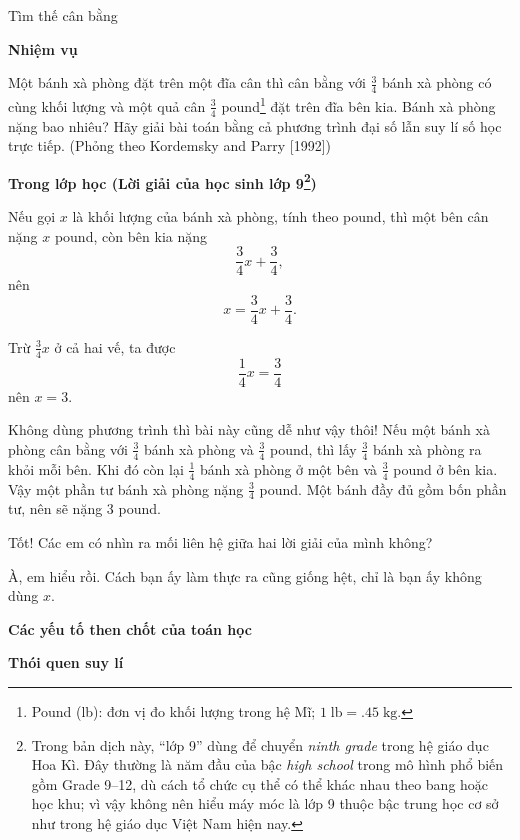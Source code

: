   {
    Tìm thế cân bằng
  }
  {
    \textbf{Nhiệm vụ}

    Một bánh xà phòng đặt trên một đĩa cân thì cân bằng với $\frac{3}{4}$ bánh xà phòng có cùng khối lượng và một quả cân $\frac{3}{4}$ pound\footnote{Pound (lb): đơn vị đo khối lượng trong hệ Mĩ; $1\;\text{lb}=.45\;\text{kg}$.} đặt trên đĩa bên kia. Bánh xà phòng nặng bao nhiêu? Hãy giải bài toán bằng cả phương trình đại số lẫn suy lí số học trực tiếp. (Phỏng theo Kordemsky and Parry [1992])

    \textbf{Trong lớp học (Lời giải của học sinh lớp 9\footnote{Trong bản dịch này, ``lớp 9'' dùng để chuyển \emph{ninth grade} trong hệ giáo dục Hoa Kì. Đây thường là năm đầu của bậc \emph{high school} trong mô hình phổ biến gồm Grade 9--12, dù cách tổ chức cụ thể có thể khác nhau theo bang hoặc học khu; vì vậy không nên hiểu máy móc là lớp 9 thuộc bậc trung học cơ sở như trong hệ giáo dục Việt Nam hiện nay.})}

    \begin{scriptlist}
    \item [Học sinh 1:] Nếu gọi $x$ là khối lượng của bánh xà phòng, tính theo pound, thì một bên cân nặng $x$ pound, còn bên kia nặng
    $$
    \frac{3}{4}x+\frac{3}{4},
    $$
    nên
    $$
    x=\frac{3}{4}x+\frac{3}{4}.
    $$

    Trừ $\frac{3}{4}x$ ở cả hai vế, ta được
    $$
    \frac{1}{4}x=\frac{3}{4}
    $$
    nên $x=3$.

    \item [Học sinh 2:] Không dùng phương trình thì bài này cũng dễ như vậy thôi! Nếu một bánh xà phòng cân bằng với $\frac{3}{4}$ bánh xà phòng và $\frac{3}{4}$ pound, thì lấy $\frac{3}{4}$ bánh xà phòng ra khỏi mỗi bên. Khi đó còn lại $\frac{1}{4}$ bánh xà phòng ở một bên và $\frac{3}{4}$ pound ở bên kia. Vậy một phần tư bánh xà phòng nặng $\frac{3}{4}$ pound. Một bánh đầy đủ gồm bốn phần tư, nên sẽ nặng $3$ pound.

    \item [Giáo viên:] Tốt! Các em có nhìn ra mối liên hệ giữa hai lời giải của mình không?

    \item [Học sinh 1:] À, em hiểu rồi. Cách bạn ấy làm thực ra cũng giống hệt, chỉ là bạn ấy không dùng $x$.
    \end{scriptlist}

    \noindent\textbf{Các yếu tố then chốt của toán học}

    \begin{hanglist}
      \vspace{\baselineskip}
    \end{hanglist}

    \noindent\textbf{Thói quen suy lí}

    \begin{hanglist}
      \vspace{\baselineskip}

    \end{hanglist}
  }{}

